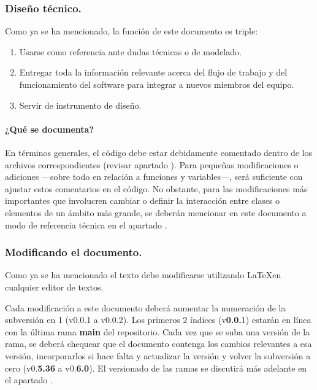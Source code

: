 \subsubsection{Diseño técnico.}\label{flujo:diseno-tecnico}
Como ya se ha mencionado, la función de este documento es triple:

\begin{enumerate}
	\item Usarse como referencia ante dudas técnicas o de modelado.
	\item Entregar toda la información relevante acerca del flujo de trabajo y del funcionamiento del software para integrar a nuevos miembros del equipo.
	\item Servir de instrumento de diseño.
\end{enumerate}

\paragraph*{¿Qué se documenta?}
En términos generales, el código debe estar debidamente comentado dentro de los archivos correspondientes (revisar apartado ). Para pequeñas modificaciones o adiciones ---sobre todo en relación a funciones y variables---, será suficiente con ajustar estos comentarios en el código. No obstante, para las modificaciones más importantes que involucren cambiar o definir la interacción entre clases o elementos de un ámbito más grande, se deberán mencionar en este documento a modo de referencia técnica en el apartado .

\subsubsection{Modificando el documento.}
Como ya se ha mencionado el texto debe modificarse utilizando \LaTeX en cualquier editor de textos. 

Cada modificación a este documento deberá aumentar la numeración de la subversión en 1 (v0.0.1 a v0.0.2). Los primeros 2 índices (v\textbf{0.0.}1) estarán en línea con la última rama \textbf{main} del repositorio. Cada vez que se suba una versión de la rama, se deberá chequear que el documento contenga los cambios relevantes a esa versión, incorporarlos si hace falta y actualizar la versión y volver la subversión a cero (v0.\textbf{5.36} a v0.\textbf{6.0}). El versionado de las ramas se discutirá más adelante en el apartado .

